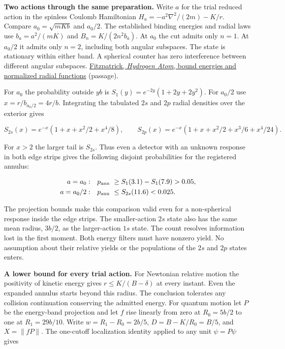 \documentclass[11pt,a4paper]{article}
\begin{document}
\textbf{Two actions through the same preparation.} Write \(a\) for the
trial reduced action in the spinless Coulomb Hamiltonian
\(H_a=-a^2\nabla^2/(2m)-K/r\). Compare \(a_0=\sqrt{mKb}\) and \(a_0/2\).
The established binding energies and radial laws use \(b_a=a^2/(mK)\)
and \(B_n=K/(2n^2 b_a)\). At \(a_0\) the cut admits only \(n=1\). At
\(a_0/2\) it admits only \(n=2\), including both angular subspaces. The
state is stationary within either band. A spherical counter has zero
interference between different angular subspaces.
\href{https://phys.libretexts.org/Bookshelves/Quantum_Mechanics/Introductory_Quantum_Mechanics_\%28Fitzpatrick\%29/08\%3A_Central_Potentials/8.03\%3A_Hydrogen_Atom}{Fitzpatrick,
\emph{Hydrogen Atom}, bound energies and normalized radial functions}
(passage).

For \(a_0\) the probability outside \(yb\) is
\(S_1(y)=e^{-2y}(1+2y+2y^2)\). For \(a_0/2\) use \(x=r/b_{a_0/2}=4r/b\).
Integrating the tabulated \(2s\) and \(2p\) radial densities over the
exterior gives

\[
 S_{2s}(x)=e^{-x}(1+x+x^2/2+x^4/8),\qquad
 S_{2p}(x)=e^{-x}(1+x+x^2/2+x^3/6+x^4/24).
\]

For \(x>2\) the larger tail is \(S_{2s}\). Thus even a detector with an
unknown response in both edge strips gives the following disjoint
probabilities for the registered annulus:

\[
 \begin{aligned}
 a=a_0:\quad &p_{\rm ann}\ \ge S_1(3.1)-S_1(7.9)>0.05,\\
 a=a_0/2:\quad &p_{\rm ann}\ \le S_{2s}(11.6)<0.025 .
 \end{aligned}
\]

The projection bounds make this comparison valid even for a
non-spherical response inside the edge strips. The smaller-action \(2s\)
state also has the same mean radius, \(3b/2\), as the larger-action
\(1s\) state. The count resolves information lost in the first moment.
Both energy filters must have nonzero yield. No assumption about their
relative yields or the populations of the \(2s\) and \(2p\) states
enters.

\textbf{A lower bound for every trial action.} For Newtonian relative
motion the positivity of kinetic energy gives \(r\le K/(B-\delta)\) at
every instant. Even the expanded annulus starts beyond this radius. The
conclusion tolerates any collision continuation conserving the admitted
energy. For quantum motion let \(P\) be the energy-band projection and
let \(f\) rise linearly from zero at \(R_0=5b/2\) to one at
\(R_1=29b/10\). Write \(w=R_1-R_0=2b/5\), \(D=B-K/R_0=B/5\), and
\(X=\|fP\|\). The one-cutoff localization identity applied to any unit
\(\psi=P\psi\) gives
\end{document}
